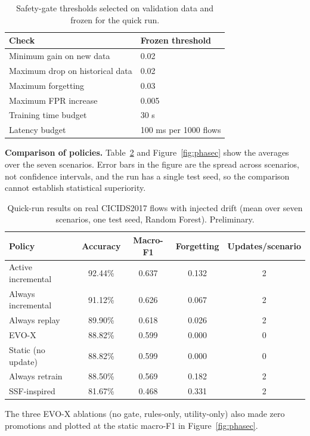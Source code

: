 \documentclass{article}
\begin{document}
\begin{table}[h]
\centering
\caption{Safety-gate thresholds selected on validation data and frozen for the quick run.}
\label{tab:gate}
\small
\begin{tabular}{p{6cm}p{6.5cm}}
\toprule
Check & Frozen threshold \\
\midrule
Minimum gain on new data & 0.02 \\
Maximum drop on historical data & 0.02 \\
Maximum forgetting & 0.03 \\
Maximum FPR increase & 0.005 \\
Training time budget & 30 s \\
Latency budget & 100 ms per 1000 flows \\
\bottomrule
\end{tabular}
\end{table}

\textbf{Comparison of policies.} Table~\ref{tab:phasec} and Figure~\ref{fig:phasec} show the averages over the seven scenarios. Error bars in the figure are the spread across scenarios, not confidence intervals, and the run has a single test seed, so the comparison cannot establish statistical superiority.

\begin{table}[h]
\centering
\caption{Quick-run results on real CICIDS2017 flows with injected drift (mean over seven scenarios, one test seed, Random Forest). Preliminary.}
\label{tab:phasec}
\small
\begin{tabular}{lcccc}
\toprule
Policy & Accuracy & Macro-F1 & Forgetting & Updates/scenario \\
\midrule
Active incremental & 92.44\% & 0.637 & 0.132 & 2 \\
Always incremental & 91.12\% & 0.626 & 0.067 & 2 \\
Always replay & 89.90\% & 0.618 & 0.026 & 2 \\
EVO-X & 88.82\% & 0.599 & 0.000 & 0 \\
Static (no update) & 88.82\% & 0.599 & 0.000 & 0 \\
Always retrain & 88.50\% & 0.569 & 0.182 & 2 \\
SSF-inspired & 81.67\% & 0.468 & 0.331 & 2 \\
\bottomrule
\end{tabular}
\par\smallskip\footnotesize The three EVO-X ablations (no gate, rules-only, utility-only) also made zero promotions and plotted at the static macro-F1 in Figure~\ref{fig:phasec}.
\end{table}
\end{document}
